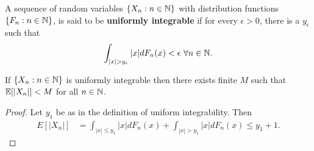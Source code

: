 \documentclass[a4paper,10pt,english]{article}
\begin{document}
\begin{defn}
A sequence of random variables $\{X_n : n \in \mathbb{N}\}$ with distribution functions $\{F_n: n \in \mathbb{N} \}$, is said to be \textbf{uniformly integrable} if for every $\epsilon>0$, there is a $y_\epsilon$ such that
\begin{align*}
\int_{|x|>y_\epsilon}|x|dF_{n}(x) < \epsilon ~\forall n \in \N.
\end{align*}
\end{defn}
\begin{lem}
If $\{X_n : n \in \mathbb{N}\}$ is uniformly integrable then there exists finite $M$ such that $\mathbb{E}[|X_n|]<M$ for all $n \in \mathbb{N}$.
\end{lem}
\begin{proof}
Let $y_1$ be as in the definition of uniform integrability. Then
\begin{align*}
E[|X_n|]&=\int_{|x|\leq y_1}|x|dF_n(x)+\int_{|x|>y_1}|x|dF_n(x) \leq y_1+1.
\end{align*}
\end{proof}
\end{document}
